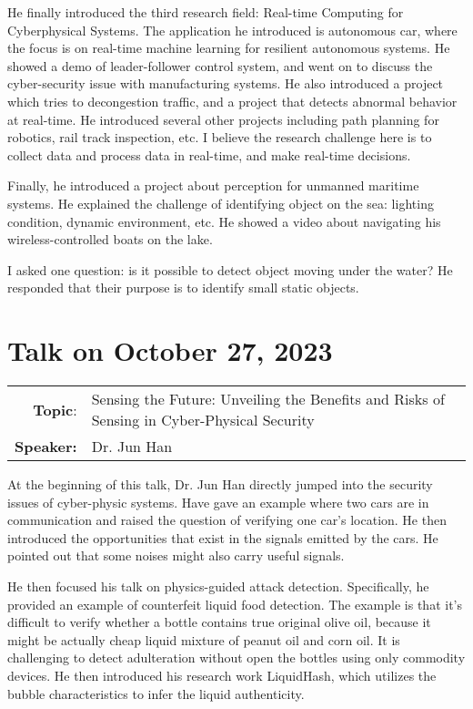 \documentclass[11pt, oneside]{article}   	%
\begin{document}
He finally introduced the third research field: Real-time Computing for Cyberphysical Systems. The application he introduced is autonomous car, where the focus is on real-time machine learning for resilient autonomous systems. He showed a demo of leader-follower control system, and went on to discuss the cyber-security issue with manufacturing systems. He also introduced a project which tries to decongestion traffic, and a project that detects abnormal behavior at real-time. He introduced several other projects including path planning for robotics, rail track inspection, etc. I believe the research challenge here is to collect data and process data in real-time, and make real-time decisions. 

Finally, he introduced a project about perception for unmanned maritime systems. He explained the challenge of identifying object on the sea: lighting condition, dynamic environment, etc. He showed a video about navigating his wireless-controlled boats on the lake. 

I asked one question: is it possible to detect object moving under the water? He responded that their purpose is to identify small static objects.

\newpage
\section{Talk on October 27, 2023}
\begin{tabularx} {\textwidth}{r X}
\textbf{Topic}: & Sensing the Future: Unveiling the Benefits and Risks of Sensing in Cyber-Physical Security \\
\textbf{Speaker:} & Dr. Jun Han\\
\end{tabularx}

At the beginning of this talk, Dr. Jun Han directly jumped into the security issues of cyber-physic systems. Have gave an example where two cars are in communication and raised the question of verifying one car's location. He then introduced the opportunities that exist in the signals emitted by the cars. He pointed out that some noises might also carry useful signals.

He then focused his talk on physics-guided attack detection. Specifically, he provided an example of counterfeit liquid food detection. The example is that it's difficult to verify whether a bottle contains true original olive oil, because it might be actually cheap liquid mixture of peanut oil and corn oil.  It is challenging to detect adulteration without open the bottles using only commodity devices. He then introduced his research work LiquidHash, which utilizes the bubble characteristics to infer the liquid authenticity. 
\end{document}
